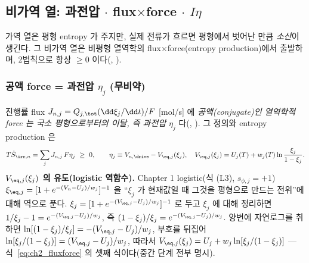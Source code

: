 \subsection{비가역 열: 과전압 $\cdot$ flux$\times$force $\cdot$ $I\eta$}\label{sec:ch2_irr}
가역 열은 평형 entropy 가 주지만, 실제 전류가 흐르면 평형에서 벗어난 만큼 \emph{소산}이 생긴다. 그 비가역 열은
비평형 열역학의 flux$\times$force(entropy production)에서 출발하며, 2법칙으로 항상 $\ge0$ 이다(,
\cite{degrootmazur1962,onsager1931}).

\subsubsection{공액 force = 과전압 $\eta_j$ (무비약)}\label{sec:ch2_fluxforce}
진행률 flux $J_{n,j}=Q_{j,\tot}(\dd\xi_j/\dd t)/F$ [mol/s] 에 \emph{공액(conjugate)인 열역학적 force 는
국소 평형으로부터의 이탈, 즉 과전압} $\eta_j$ 다(\cite{newman,bardfaulkner}, ). 그 정의와 entropy
production 은
\begin{equation}
T\dot S_{\irr,n}=\sum_j J_{n,j}\,F\eta_j\ \ge\ 0,\qquad
\eta_j\equiv V_{n,\drive}-V_{\eq,j}(\xi_j),\quad
V_{\eq,j}(\xi_j)=U_j(T)+w_j(T)\ln\frac{\xi_j}{1-\xi_j}.
\label{eq:ch2_fluxforce}
\end{equation}
\textbf{$V_{\eq,j}(\xi_j)$ 의 유도(logistic 역함수).} Chapter 1 logistic(식 (L3), $s_{\phi,j}=+1$)
$\xi_{\eq,j}=[1+e^{-(V_n-U_j)/w_j}]^{-1}$ 을 ``$\xi_j$ 가 현재값일 때 그것을 평형으로 만드는 전위''에 대해
역으로 푼다. $\xi_j=[1+e^{-(V_{\eq,j}-U_j)/w_j}]^{-1}$ 로 두고 $\xi_j$ 에 대해 정리하면 $1/\xi_j-1=e^{-(V_{\eq,j}-U_j)/w_j}$,
즉 $(1-\xi_j)/\xi_j=e^{-(V_{\eq,j}-U_j)/w_j}$. 양변에 자연로그를 취하면 $\ln[(1-\xi_j)/\xi_j]=-(V_{\eq,j}-U_j)/w_j$,
부호를 뒤집어 $\ln[\xi_j/(1-\xi_j)]=(V_{\eq,j}-U_j)/w_j$, 따라서 $V_{\eq,j}(\xi_j)=U_j+w_j\ln[\xi_j/(1-\xi_j)]$
— 식~\eqref{eq:ch2_fluxforce} 의 셋째 식이다(중간 단계 전부 명시).

